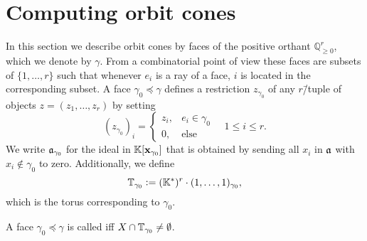 \section{Computing orbit cones}

In this section we describe orbit cones by faces of the positive orthant $\mathbb{Q}_{\geq 0}^r$, which we denote by $\gamma$.
%
From a combinatorial point of view these faces are subsets of $\{1,\dots,r\}$ such that whenever $e_i$ is a ray of a face, $i$ is located in the corresponding subset. A face $\gamma_0 \preceq \gamma$ defines a restriction $z_{\gamma_0}$ of any $r$\=/tuple of objects $z=(z_1,\dots,z_r)$ by setting
$$(z_{\gamma_0})_i =
\begin{cases}
z_i, & e_i\in\gamma_0 \\
0, & \text{else}
\end{cases}\quad 1\leq i \leq r.$$
We write $\mathfrak{a}_{\gamma_0}$ for the ideal in $\mathbb{K}[\mathbf{x}_{\gamma_0}]$ that is obtained by sending all $x_i$ in $\mathfrak{a}$ with $x_i\notin\gamma_0$ to zero.
%
Additionally, we define
$$\mathbb{T}_{\gamma_0} \mathrel{\mathop:}= (\mathbb{K}^*)^r \cdot (1,\dots,1)_{\gamma_0},$$
which is the torus corresponding to $\gamma_0$.
%

\begin{defi}[\aface]
	A face $\gamma_0\preceq\gamma$ is called \emph{\aface{}} iff $X\cap \mathbb{T}_{\gamma_0} \neq \emptyset$.
\end{defi}

